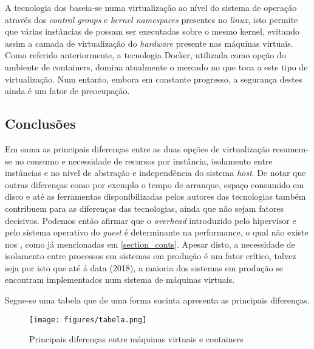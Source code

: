 A tecnologia dos \conts baseia-se numa virtualização ao nível do sistema de operação através dos \textit{control groups} e \textit{kernel namespaces} presentes no \textit{linux}, isto permite que várias instâncias de \conts possam ser executadas sobre o mesmo kernel, evitando assim a camada de virtualização do \textit{hardware} presente nas máquinas virtuais. Como referido anteriormente, a tecnologia Docker, utilizada como opção do ambiente de containers, domina atualmente o mercado no que toca a este tipo de virtualização. Num entanto, embora em constante progresso, a segurança destes ainda é um fator de preocupação.

\subsection{Conclusões}

Em suma as principais diferenças entre as duas opções de virtualização resumem-se no consumo e necessidade de recursos por instância, isolamento entre instâncias e no nível de abstração e independência do sistema \textit{host}. De notar que outras diferenças como por exemplo o tempo de arranque, espaço consumido em disco e até as ferramentas disponibilizadas pelos autores das tecnologias também contribuem para  as diferenças das tecnologias, ainda que não sejam fatores decisivos. Podemos então afirmar que o \textit{overhead} introduzido pelo hipervisor e pelo sistema operativo do \textit{guest} é determinante na performance, o qual não existe nos \conts, como já mencionadas em \ref{section_conts}. Apesar disto, a necessidade de isolamento entre processos em sistemas em produção é um fator crítico, talvez seja por isto que até á data (2018), a maioria dos sistemas em produção se encontram implementados num sistema de máquinas virtuais.

Segue-se uma tabela que de uma forma sucinta apresenta as principais diferenças.

\begin{figure}[H]
	\texttt{[image: figures/tabela.png]}
	\caption{Principais diferenças entre máquinas virtuais e containers}
	\label{fig:vms-conts-tabela}
\end{figure}
